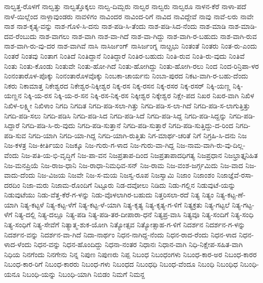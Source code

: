ನಾಲ್ವತ್ತ-ರೊಳಗೆ
ನಾಲ್ವತ್ತು
ನಾಲ್ವತ್ತೊಕ್ಕಲು
ನಾಲ್ವ-ದಿಮ್ಬರು
ನಾಲ್ವರ
ನಾಲ್ವರು
ನಾಲ್ವರೂ
ನಾಳನ-ಕೆರೆ
ನಾಳಾ-ಪದೆ
ನಾಳೆ-ಯಿಲ್ಲೆಂದ
ನಾಳ್ಗಾವುಂಡರು
ನಾವಳಿಗಂ
ನಾವಿಂದರ
ನಾವಿಂದ-ರಿಗೆ
ನಾವಿದ
ನಾವಿದ್ದೇವೆ
ನಾವು
ನಾವೆ-ಲರು
ನಾವೇ
ನಾಶ
ನಾಶ-ಕೃತ್ಯ-ವನ್ನು
ನಾಶ-ಗೊಳಿ-ಸಿ-ದನು
ನಾಶ-ಪಡಿ-ಸಿ-ತೆಂದು
ನಾಶ-ಪಡಿ-ಸಿದ-ನೆಂದು
ನಾಶ-ಮಾಡಿ
ನಾಶ-ಮಾಡಿ-ದವ-ರೆಂಬುದು
ನಾಶ-ವಾಗಲು
ನಾಶ-ವಾಗಿ
ನಾಶ-ವಾ-ಗಿದೆ
ನಾಶ-ವಾ-ಗಿದ್ದು
ನಾಶ-ವಾಗಿ-ರ-ಬಹುದು
ನಾಶ-ವಾಗಿ-ರುವ
ನಾಶ-ವಾಗಿ-ರು-ವು-ದರ
ನಾಶ-ವಾಗಿವೆ
ನಾಸಿ
ನಾಸಿರ್ಜಂಗ್
ನಾಸಿರ್ಜಂಗ್ನ
ನಾೞ್ಪ್ರಭು
ನಿಂತಂತೆ
ನಿಂತರು
ನಿಂತ-ರು-ಎಂದು
ನಿಂತರೆ
ನಿಂತವು
ನಿಂತಾಗ
ನಿಂತಿದೆ
ನಿಂತಿದ್ದಾನೆ
ನಿಂತಿದ್ದಾರೆ
ನಿಂತಿರ-ಬಹುದು
ನಿಂತಿ-ರುವ
ನಿಂತಿ-ರು-ವುದು
ನಿಂತಿವೆ
ನಿಂತು
ನಿಂತು-ಕೊಂಡು
ನಿಂತುವೇ
ನಿಂತು-ಹೋ-ಗಿದೆ
ನಿಂತು-ಹೋಗಿದ್ದು
ನಿಂತು-ಹೋಗಿ-ರಲು
ನಿಂದ
ನಿಂದ-ರಿನ್ರಿಪಾ-ಳರ
ನಿಂನಂತಾರೊಳ-ಪೊಕ್ಕು
ನಿಂನಂತಾರೊಳವೊಕ್ಕು
ನಿಂಬಕಾ-ಚಾರ್ಯನು
ನಿಂಬಾ-ಪುರದ
ನಿಕಟ-ವಾಗಿ-ರ-ಬಹು-ದೆಂದು
ನಿಕರು
ನಿಕಾಮಾತ್ತ
ನಿಕೇಶ್ವರದ
ನಿಕೇಶ್ವರ-ನಿಕ್ಕೀಶ್ವರ
ನಿಕ್ಕ-ರಸ
ನಿಕ್ಕ-ರಸನ
ನಿಕ್ಕ-ರಸರ
ನಿಕ್ಕ-ರಸರ್
ನಿಕ್ಕಿ-ಯಣ್ಣ
ನಿಕ್ಕಿ-ಯಣ್ಣನ
ನಿಕ್ಕಿ-ಯ-ರಸ
ನಿಕ್ಕಿ-ಯ-ರ-ಸನ
ನಿಕ್ಕಿ-ರಸ-ನಿಕ್ಕ-ರಸ
ನಿಕ್ಕೀಶ್ವರ
ನಿಕ್ಕೇಶ್ವರ
ನಿಕ್ಷೇ-ಪದ
ನಿಖರ
ನಿಖರ-ವಾಗಿ
ನಿಖಿಳ
ನಿಖಿಳ-ಲಕ್ಷ್ಮೀ
ನಿಖಿಳಾಂ
ನಿಗದಿ
ನಿಗದಿತ
ನಿಗದಿ-ಪಡಿ-ಸಲಾ-ಗಿತ್ತು
ನಿಗದಿ-ಪಡಿ-ಸ-ಲಾ-ಗಿದೆ
ನಿಗದಿ-ಪಡಿ-ಸ-ಲಾಗುತ್ತಿತ್ತು
ನಿಗದಿ-ಪಡಿ-ಸಲು
ನಿಗದಿ-ಪಡಿಸಿ
ನಿಗದಿ-ಪಡಿ-ಸಿದ
ನಿಗದಿ-ಪಡಿ-ಸಿದೆ
ನಿಗದಿ-ಪಡಿ-ಸಿದ್ದ
ನಿಗದಿ-ಪಡಿ-ಸಿದ್ದನ್ನು
ನಿಗದಿ-ಪಡಿ-ಸಿದ್ದಾರೆ
ನಿಗದಿ-ಪಡಿ-ಸಿ-ರು-ವುದು
ನಿಗದಿ-ಪಡಿ-ಸುತ್ತಾನೆ
ನಿಗದಿ-ಪಡಿ-ಸುತ್ತಾರೆ
ನಿಗದಿ-ಪಡಿ-ಸುತ್ತಿದ್ದು-ದ-ರಿಂದ
ನಿಗದಿ-ಪಡಿ-ಸುವ
ನಿಗದಿ-ಯಾಗಿ
ನಿಗದಿ-ಯಾ-ಗಿದ್ದ
ನಿಗದಿ-ಯಾಗಿ-ರುತ್ತಿತು
ನಿಗ-ಮಾರ್ಥ-ಚರಿತೆ
ನಿಗೆ
ನಿಗ್ರಹಿ-ಸಿ-ದನು
ನಿಜ
ನಿಜ-ಕಳತ್ರ
ನಿಜ-ಕೀರ್ತಿಯಂ
ನಿಜಕ್ಕೂ
ನಿಜ-ಗುರು-ಗ-ಳಾದ
ನಿಜ-ಗುರು-ವಾ-ಗಿದ್ದ
ನಿಜ-ನಾಮ-ವಾಗಿ-ರು-ವು-ದಿಲ್ಲ-ವೆಂದು
ನಿಜ-ಪತಿ-ಯ-ಭಿ-ವೃದ್ಧಿಗೆ
ನಿಜ-ಪಾ-ವನ
ನಿಜಪ್ರತಾಪ-ದಿಂದ
ನಿಜಪ್ರತಾಪಾದಧಿಗತ್ಯ
ನಿಜಪ್ರಧಾನ
ನಿಜಭ್ರಾತ್ತೃನಿಹಿತ
ನಿಜ-ಮನಪ್ರಿಯೆ
ನಿಜ-ರಾಜ-ಧಾನಿ
ನಿಜ-ರಾಧಾ-ನಿಮಧಿವ-ಸನ್
ನಿಜ-ರಾಮ
ನಿಜ-ವಂಶ-ಜರ್ಗ್ಗಮಿದು
ನಿಜ-ವಾದ
ನಿಜ-ವಾದು-ದೆಂದು
ನಿಜ-ವಿಜಯ
ನಿಜವೇ
ನಿಜ-ಸ-ಮಯ
ನಿಜಸ್ವ-ರೂಪ
ನಿಜಸ್ವಾಮಿ
ನಿಜಾಂ
ನಿಜಾಂಶಂ
ನಿಜಾಜ್ಞೆವೆ-ರಸಾ-ದರದಿಂ
ನಿಜಾ-ಮರು
ನಿಜಾಮ-ರೊಂದಿಗೆ
ನಿಟ್ಟೂರು
ನಿಡ-ದವೋಲು
ನಿಡಿದು
ನಿಡು-ಗಲ್ಲಿನ
ನಿಡುವುಟೆ-ಯನ್ನು
ನಿಡುವುಟೆಯು
ನಿಡು-ವೆತ್ತ-ಕೆರೆ-ಗ-ಳನ್ನು
ನಿಡು-ವೊಳಲಾಗಿರ-ಬಹುದು
ನಿತ್ತರಿಸಲಾ-ರದೆ
ನಿತ್ಯ
ನಿತ್ಯಂ
ನಿತ್ಯ-ಕಟ್ಟ-ಣೆ-ಯಾಗಿ
ನಿತ್ಯ-ಕಟ್ಟಳೆ
ನಿತ್ಯ-ಕಟ್ಟ-ಳೆಗೆ
ನಿತ್ಯ-ಕಟ್ಟ-ಳೆ-ಯಾಗಿ
ನಿತ್ಯ-ಕೃತ್ಯ
ನಿತ್ಯ-ಕೃತ್ಯ-ಗ-ಳಿಗೆ
ನಿತ್ಯಕ್ರತು
ನಿತ್ಯ-ಗಟ್ಟಲೆ
ನಿತ್ಯ-ಗಟ್ಟ-ಳೆಗೆ
ನಿತ್ಯ-ದಲ್ಲಿ
ನಿತ್ಯ-ದಲ್ಲೂ
ನಿತ್ಯ-ಪಡಿ
ನಿತ್ಯ-ಪಡಿ-ತರ-ದೀಪಾರಾ-ಧನೆ
ನಿತ್ಯಪ್ರ-ವಾಸಿ
ನಿತ್ಯವೂ
ನಿತ್ಯ-ಸಂದಿಗೆ
ನಿತ್ಯ-ಸಂಧಿ
ನಿತ್ಯ-ಸಂಧಿಗೆ
ನಿತ್ಯ-ಸೇವೆಗೆ
ನಿತ್ಯಾತ್ಮ-ಶುಕ-ಯೋಗಿ
ನಿತ್ಯೋತ್ಸವ
ನಿತ್ಯೋತ್ಸಾಹ-ಗ-ಳಿಗೆ
ನಿದರ್ಶನ
ನಿದರ್ಶನ-ಗ-ಳನ್ನು
ನಿದರ್ಶನ-ವನ್ನು
ನಿದರ್ಶನ-ವಾ-ಗಿದೆ
ನಿದಾ-ನಾರ್ಥಂ
ನಿಧನ-ನಾಗಿದ್ದ-ನೆಂದು
ನಿಧನ-ರಾದ-ರೆಂದು
ನಿಧನ-ಳಾದ
ನಿಧನ-ಳಾದ-ಳೆಂದು
ನಿಧನ-ವನ್ನು
ನಿಧನ-ಹೊಂದಿದ್ದು
ನಿಧನಾ-ನಂತರ
ನಿಧಾನಃ
ನಿಧಾನ-ವಾಗಿ
ನಿಧಿ-ನಿಕ್ಷೇಪ-ಸಹಿತ-ವಾಗಿ
ನಿಧಿಯ
ನಿನಗೆಂದು
ನಿನಗೇನು
ನಿನ್ನ
ನಿಪುಣ
ನಿಪುಣರು
ನಿಪ್ಪ
ನಿಬಂಧ
ನಿಬಂಧಂಗಳು
ನಿಬಂಧ-ಕಾರ-ಅರ
ನಿಬಂಧ-ಕಾರರ
ನಿಬಂಧ-ಕಾರ-ರಿಗೆ
ನಿಬಂಧ-ಕಾರರು
ನಿಬಂಧ-ಗಳು
ನಿಬಂಧದ
ನಿಬಂಧಧಿ
ನಿಬಂಧ-ವೆಂದೂ
ನಿಬಂಧಿ
ನಿಬಂಧಿಧ
ನಿಬಂಧಿ-ಯನೂ
ನಿಬಂಧಿ-ಯನ್ನು
ನಿಬಂಧಿ-ಯಾಗಿ
ನಿಬಿಡಂ
ನಿಮಗೆ
ನಿಮನ್ದ
